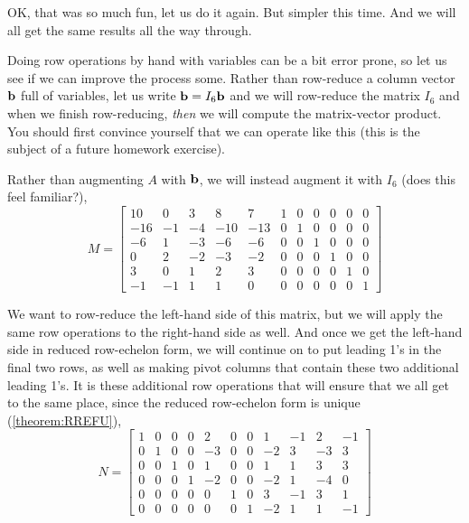 \documentclass{ximera}
\begin{document}
\begin{example}[Redux]
  OK, that was so much fun, let us do it again.  But simpler this
  time.  And we will all get the same results all the way through.

  Doing row operations by hand with variables can be a bit error
  prone, so let us see if we can improve the process some.  Rather
  than row-reduce a column vector $\mathbf{b}$ full of variables, let us
  write $\mathbf{b}=I_6\mathbf{b}$ and we will row-reduce the matrix $I_6$
  and when we finish row-reducing, \textit{then} we will compute the
  matrix-vector product.  You should first convince yourself that we
  can operate like this (this is the subject of a future homework
  exercise).

  Rather than augmenting $A$ with $\mathbf{b}$, we will instead augment
  it with $I_6$ (does this feel familiar?),
  \[
    M=
    \begin{bmatrix}
      10 & 0 & 3 & 8 & 7 & 1 & 0 & 0 & 0 & 0 & 0 \\
      -16 & -1 & -4 & -10 & -13 & 0 & 1 & 0 & 0 & 0 & 0 \\
      -6 & 1 & -3 & -6 & -6 & 0 & 0 & 1 & 0 & 0 & 0 \\
      0 & 2 & -2 & -3 & -2 & 0 & 0 & 0 & 1 & 0 & 0 \\
      3 & 0 & 1 & 2 & 3 & 0 & 0 & 0 & 0 & 1 & 0 \\
      -1 & -1 & 1 & 1 & 0 & 0 & 0 & 0 & 0 & 0 & 1
    \end{bmatrix}
  \]

  We want to row-reduce the left-hand side of this matrix, but we will
  apply the same row operations to the right-hand side as well.  And
  once we get the left-hand side in reduced row-echelon form, we will
  continue on to put leading 1's in the final two rows, as well as
  making pivot columns that contain these two additional leading 1's.
  It is these additional row operations that will ensure that we all
  get to the same place, since the reduced row-echelon form is unique
  (\ref{theorem:RREFU}),
  \[
    N=
    \begin{bmatrix}
      1 & 0 & 0 & 0 & 2 & 0 & 0 & 1 & -1 & 2 & -1 \\
      0 & 1 & 0 & 0 & -3 & 0 & 0 & -2 & 3 & -3 & 3 \\
      0 & 0 & 1 & 0 & 1 & 0 & 0 & 1 & 1 & 3 & 3 \\
      0 & 0 & 0 & 1 & -2 & 0 & 0 & -2 & 1 & -4 & 0 \\
      0 & 0 & 0 & 0 & 0 & 1 & 0 & 3 & -1 & 3 & 1 \\
      0 & 0 & 0 & 0 & 0 & 0 & 1 & -2 & 1 & 1 & -1
    \end{bmatrix}
  \]


\end{example}
\end{document}
